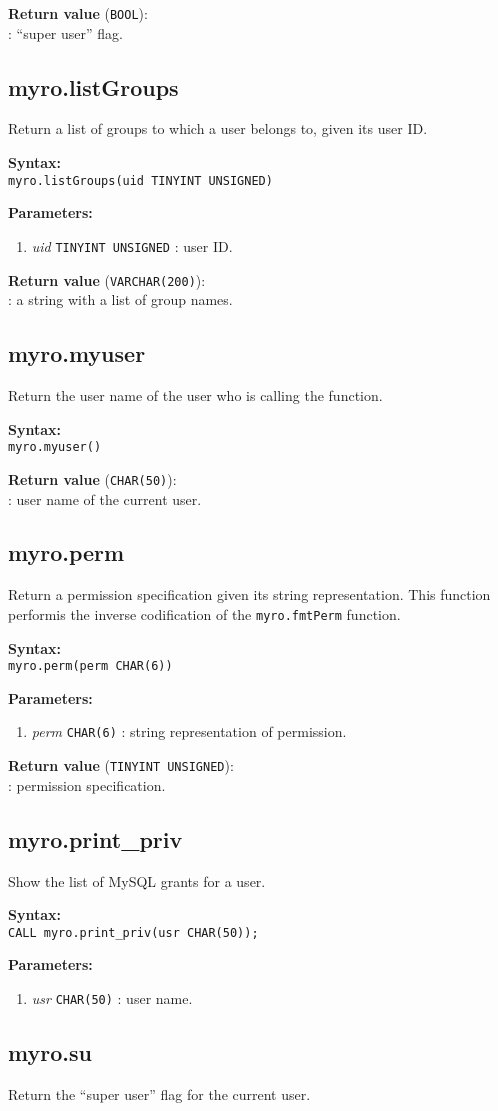 \documentclass[12pt,titlepage]{article}
\newcommand{\syntax}[1]
{
  \bigskip
  \noindent
  \textbf{Syntax: } \\ 
  \indent \texttt{#1}
}
\newenvironment{parameters}
{
  \bigskip
  \noindent
  \textbf{Parameters:}
  \begin{enumerate}
}
{
  \end{enumerate}
}
\newcommand{\param}[2]
{
  \item \textit{#1} \texttt{#2} 
}
\newcommand{\return}[1]
{
  \bigskip
  \noindent
  \textbf{Return value} (\texttt{#1}): \\
  \indent
}
\begin{document}
\return{BOOL}: ``super user'' flag.

%
\subsection{myro.listGroups}
Return a list of groups to which a user belongs to, given its user ID.

\syntax{myro.listGroups(uid TINYINT UNSIGNED)}

\begin{parameters}
\param{uid}{TINYINT UNSIGNED}: user ID.
\end{parameters}

\return{VARCHAR(200)}: a string with a list of group names.

%
\subsection{myro.myuser}
Return the user name of the user who is calling the function.

\syntax{myro.myuser()}

\return{CHAR(50)}: user name of the current user.



\subsection{myro.perm}
Return a permission specification given its string representation.
This function performis the inverse codification of the
\verb|myro.fmtPerm| function.

\syntax{myro.perm(perm CHAR(6))}

\begin{parameters}
\param{perm}{CHAR(6)}: string representation of permission.
\end{parameters}

\return{TINYINT UNSIGNED}: permission specification.

%
\subsection{myro.print\_priv}
Show the list of MySQL grants for a user.

\syntax{CALL myro.print\_priv(usr CHAR(50));}

\begin{parameters}
\param{usr}{CHAR(50)}: user name.
\end{parameters}

%
\subsection{myro.su}
Return the ``super user'' flag for the current user.
\end{document}
